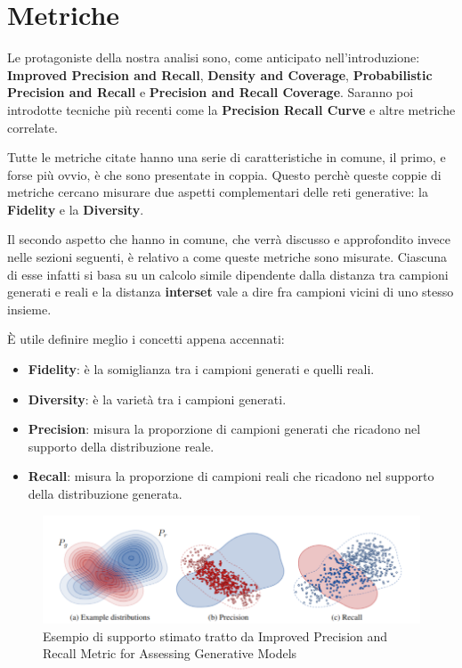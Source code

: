 \chapter{Metriche}\label{ch:chapter1}

Le protagoniste della nostra analisi sono, come anticipato nell'introduzione: 
\textbf{Improved Precision and Recall}, \textbf{Density and Coverage}, \textbf{Probabilistic Precision and Recall} e \textbf{Precision and Recall Coverage}. 
Saranno poi introdotte tecniche più recenti come la \textbf{Precision Recall Curve} e altre metriche correlate.\

Tutte le metriche citate hanno una serie di caratteristiche in comune, il primo, e forse più ovvio, è che sono presentate in coppia. 
Questo perchè queste coppie di metriche cercano misurare due aspetti complementari delle reti generative: la \textbf{Fidelity} e la \textbf{Diversity}.\ 

Il secondo aspetto che hanno in comune, che verrà discusso e approfondito invece nelle sezioni seguenti, è relativo a come queste metriche sono misurate. Ciascuna di esse infatti 
si basa su un calcolo simile dipendente dalla distanza tra campioni generati e reali e la distanza \textbf{interset} vale a dire fra campioni vicini di uno stesso insieme.\

È utile definire meglio i concetti appena accennati: 
\begin{itemize}
    \item \textbf{Fidelity}: è la somiglianza tra i campioni generati e quelli reali.
    \item \textbf{Diversity}: è la varietà tra i campioni generati.
    \item \textbf{Precision}: misura la proporzione di campioni generati che ricadono nel supporto della distribuzione reale.
    \item \textbf{Recall}: misura la proporzione di campioni reali che ricadono nel supporto della distribuzione generata.
\end{itemize}

\begin{figure}[htbp]
    \centering
    \includegraphics[width=\linewidth]{../images/2_PrecisionRecallManifold_si.png}
    \caption{Esempio di supporto stimato tratto da Improved Precision and Recall Metric for Assessing Generative Models \cite{2ImprovedPrecisionRecall}}
\end{figure}

